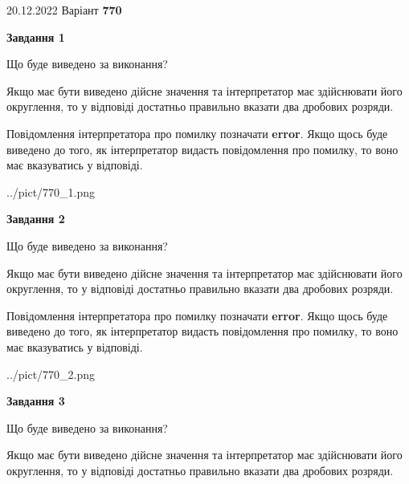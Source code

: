 \documentclass[12pt, ukrainian]{article}
\begin{document}
{20.12.2022 Варіант \No \textbf { 770 }\par}
{
\begin {Large}

{\begin {center}\textbf{Завдання 1}\end {center}}\par
Що буде виведено за виконання? \par

Якщо має бути виведено дійсне значення та інтерпретатор має здійснювати його округлення, 
то у відповіді достатньо правильно вказати два дробових розряди.

Повідомлення інтерпретатора про помилку позначати \textbf{error}.
Якщо щось буде виведено до того, як інтерпретатор видасть повідомлення про помилку, 
то воно має вказуватись у відповіді. \par

\begin{center}
	{../pict/770_1.png}
\end{center}
\newpage

{\begin {center}\textbf{Завдання 2}\end {center}}\par
Що буде виведено за виконання? \par

Якщо має бути виведено дійсне значення та інтерпретатор має здійснювати його округлення, 
то у відповіді достатньо правильно вказати два дробових розряди.

Повідомлення інтерпретатора про помилку позначати \textbf{error}.
Якщо щось буде виведено до того, як інтерпретатор видасть повідомлення про помилку, 
то воно має вказуватись у відповіді. \par

\begin{center}
	{../pict/770_2.png}
\end{center}
\newpage

{\begin {center}\textbf{Завдання 3}\end {center}}\par
Що буде виведено за виконання? \par

Якщо має бути виведено дійсне значення та інтерпретатор має здійснювати його округлення, 
то у відповіді достатньо правильно вказати два дробових розряди.


\end{Large}}
\end{document}
